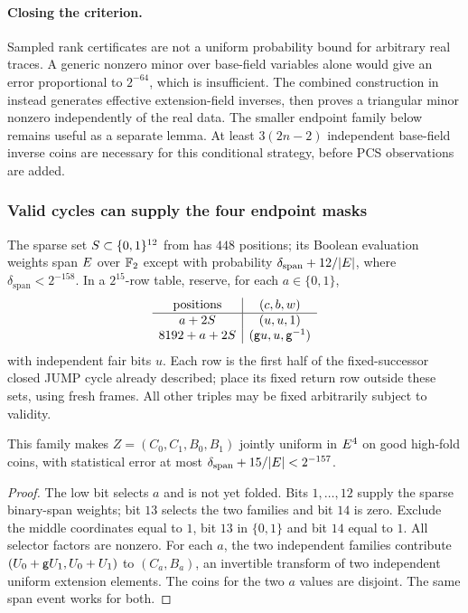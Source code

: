 \paragraph{Closing the criterion.} Sampled rank certificates are not a uniform probability bound for arbitrary real traces. A generic nonzero minor over base-field variables alone would give an error proportional to $2^{-64}$, which is insufficient. The combined construction in  instead generates effective extension-field inverses, then proves a triangular minor nonzero independently of the real data. The smaller endpoint family below remains useful as a separate lemma. At least $3(2n-2)$ independent base-field inverse coins are necessary for this conditional strategy, before PCS observations are added.

\subsubsection{Valid cycles can supply the four endpoint masks}

The sparse set $S\subset\{0,1\}^{12}$ from  has $448$ positions; its Boolean evaluation weights span $E$ over $\mathbb{F}_2$ except with probability $\delta_{\mathrm{span}}+12/|E|$, where $\delta_{\mathrm{span}}<2^{-158}$. In a $2^{15}$-row table, reserve, for each $a\in\{0,1\}$,
\[
\begin{array}{c|c}
\text{positions} & (c,b,w)\\\hline
a+2S & (u,u,1)\\
8192+a+2S & (\mathsf{g} u,u,\mathsf{g}^{-1})
\end{array}
\]
with independent fair bits $u$. Each row is the first half of the fixed-successor closed JUMP cycle already described; place its fixed return row outside these sets, using fresh frames. All other triples may be fixed arbitrarily subject to validity.

\begin{lemma}\label{lem:jump-endpoints}
This family makes $Z=(C_0,C_1,B_0,B_1)$ jointly uniform in $E^4$ on good high-fold coins, with statistical error at most $\delta_{\mathrm{span}}+15/|E|<2^{-157}$.
\end{lemma}
\begin{proof}
The low bit selects $a$ and is not yet folded. Bits $1,\ldots,12$ supply the sparse binary-span weights; bit $13$ selects the two families and bit $14$ is zero. Exclude the middle coordinates equal to $1$, bit $13$ in $\{0,1\}$ and bit $14$ equal to $1$. All selector factors are nonzero. For each $a$, the two independent families contribute $(U_0+\mathsf{g} U_1,U_0+U_1)$ to $(C_a,B_a)$, an invertible transform of two independent uniform extension elements. The coins for the two $a$ values are disjoint. The same span event works for both.
\end{proof}

